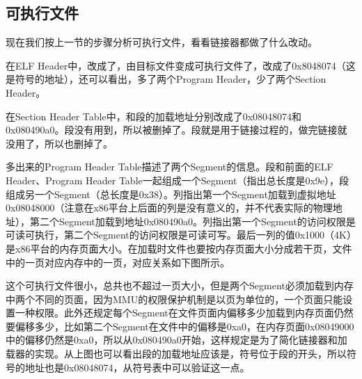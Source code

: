 \subsection{可执行文件}
%


现在我们按上一节的步骤分析可执行文件，看看链接器都做了什么改动。




在ELF Header中，改成了，由目标文件变成可执行文件了，改成了0x8048074（这是符号的地址），还可以看出，多了两个Program Header，少了两个Section Header。



在Section Header Table中，和段的加载地址分别改成了0x08048074和0x080490a0。段没有用到，所以被删掉了。段就是用于链接过程的，做完链接就没用了，所以也删掉了。



多出来的Program Header Table描述了两个Segment的信息。段和前面的ELF Header、Program Header Table一起组成一个Segment（指出总长度是0x9e），段组成另一个Segment（总长度是0x38）。列指出第一个Segment加载到虚拟地址0x08048000（注意在x86平台上后面的列是没有意义的，并不代表实际的物理地址），第二个Segment加载到地址0x080490a0。列指出第一个Segment的访问权限是可读可执行，第二个Segment的访问权限是可读可写。最后一列的值0x1000（4K）是x86平台的内存页面大小。在加载时文件也要按内存页面大小分成若干页，文件中的一页对应内存中的一页，对应关系如下图所示。




这个可执行文件很小，总共也不超过一页大小，但是两个Segment必须加载到内存中两个不同的页面，因为MMU的权限保护机制是以页为单位的，一个页面只能设置一种权限。此外还规定每个Segment在文件页面内偏移多少加载到内存页面仍然要偏移多少，比如第二个Segment在文件中的偏移是0xa0，在内存页面0x08049000中的偏移仍然是0xa0，所以从0x080490a0开始，这样规定是为了简化链接器和加载器的实现。从上图也可以看出段的加载地址应该是，符号位于段的开头，所以符号的地址也是0x08048074，从符号表中可以验证这一点。



